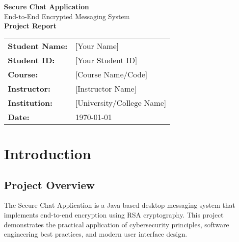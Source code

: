\documentclass[12pt,a4paper]{article}
\begin{document}
\begin{titlepage}
    \centering
    \vspace*{2cm}
    
    {\huge\bfseries Secure Chat Application}\\[0.5cm]
    {\Large End-to-End Encrypted Messaging System}\\[1.5cm]
    
    {\large\bfseries Project Report}\\[2cm]
    
    \begin{tabular}{ll}
        \textbf{Student Name:} & [Your Name] \\[0.3cm]
        \textbf{Student ID:} & [Your Student ID] \\[0.3cm]
        \textbf{Course:} & [Course Name/Code] \\[0.3cm]
        \textbf{Instructor:} & [Instructor Name] \\[0.3cm]
        \textbf{Institution:} & [University/College Name] \\[0.3cm]
        \textbf{Date:} & \today \\
    \end{tabular}
    
    \vfill
    
    \begin{abstract}
    This report presents the design, implementation, and analysis of a secure chat application developed in Java. The application demonstrates end-to-end encryption using RSA cryptography, modern user interface design, and secure coding practices. The system provides a comprehensive solution for encrypted communication while maintaining usability and security standards.
    \end{abstract}
    
    \vfill
    
\end{titlepage}

\tableofcontents
\newpage

\listoffigures
\newpage

\section{Introduction}

\subsection{Project Overview}
The Secure Chat Application is a Java-based desktop messaging system that implements end-to-end encryption using RSA cryptography. This project demonstrates the practical application of cybersecurity principles, software engineering best practices, and modern user interface design.
\end{document}
